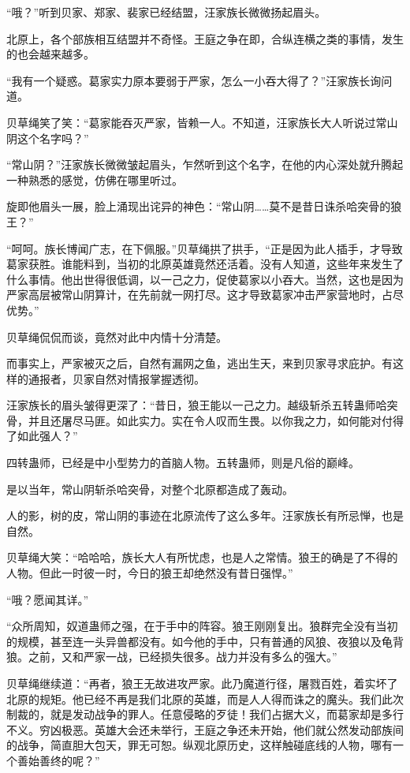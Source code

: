 
\begin{this_body}

“哦？”听到贝家、郑家、裴家已经结盟，汪家族长微微扬起眉头。

北原上，各个部族相互结盟并不奇怪。王庭之争在即，合纵连横之类的事情，发生的也会越来越多。

“我有一个疑惑。葛家实力原本要弱于严家，怎么一小吞大得了？”汪家族长询问道。

贝草绳笑了笑：“葛家能吞灭严家，皆赖一人。不知道，汪家族长大人听说过常山阴这个名字吗？”

“常山阴？”汪家族长微微皱起眉头，乍然听到这个名字，在他的内心深处就升腾起一种熟悉的感觉，仿佛在哪里听过。

旋即他眉头一展，脸上涌现出诧异的神色：“常山阴……莫不是昔日诛杀哈突骨的狼王？”

“呵呵。族长博闻广志，在下佩服。”贝草绳拱了拱手，“正是因为此人插手，才导致葛家获胜。谁能料到，当初的北原英雄竟然还活着。没有人知道，这些年来发生了什么事情。他出世得很低调，以一己之力，促使葛家以小吞大。当然，这也是因为严家高层被常山阴算计，在先前就一网打尽。这才导致葛家冲击严家营地时，占尽优势。”

贝草绳侃侃而谈，竟然对此中内情十分清楚。

而事实上，严家被灭之后，自然有漏网之鱼，逃出生天，来到贝家寻求庇护。有这样的通报者，贝家自然对情报掌握透彻。

汪家族长的眉头皱得更深了：“昔日，狼王能以一己之力。越级斩杀五转蛊师哈突骨，并且还屠尽马匪。如此实力。实在令人叹而生畏。以你我之力，如何能对付得了如此强人？”

四转蛊师，已经是中小型势力的首脑人物。五转蛊师，则是凡俗的巅峰。

是以当年，常山阴斩杀哈突骨，对整个北原都造成了轰动。

人的影，树的皮，常山阴的事迹在北原流传了这么多年。汪家族长有所忌惮，也是自然。

贝草绳大笑：“哈哈哈，族长大人有所忧虑，也是人之常情。狼王的确是了不得的人物。但此一时彼一时，今日的狼王却绝然没有昔日强悍。”

“哦？愿闻其详。”

“众所周知，奴道蛊师之强，在于手中的阵容。狼王刚刚复出。狼群完全没有当初的规模，甚至连一头异兽都没有。如今他的手中，只有普通的风狼、夜狼以及龟背狼。之前，又和严家一战，已经损失很多。战力并没有多么的强大。”

贝草绳继续道：“再者，狼王无故进攻严家。此乃魔道行径，屠戮百姓，着实坏了北原的规矩。他已经不再是我们北原的英雄，而是人人得而诛之的魔头。我们此次制裁的，就是发动战争的罪人。任意侵略的歹徒！我们占据大义，而葛家却是多行不义。穷凶极恶。英雄大会还未举行，王庭之争还未开始，他们就公然发动部族间的战争，简直胆大包天，罪无可恕。纵观北原历史，这样触碰底线的人物，哪有一个善始善终的呢？”


\end{this_body}
